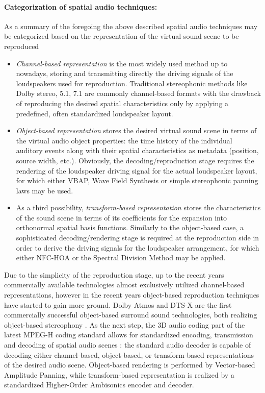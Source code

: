 \paragraph{Categorization of spatial audio techniques:}
As a summary of the foregoing the above described spatial audio techniques may be categorized based on the representation of the virtual sound scene to be reproduced \cite{Spors2013:Survey}
\begin{itemize}
\item \emph{Channel-based representation} is the most widely used method up to nowadays, storing and transmitting directly the driving signals of the loudspeakers used for reproduction.
Traditional stereophonic methods like Dolby stereo, 5.1, 7.1 are commonly channel-based formats with the drawback of reproducing the desired spatial characteristics only by applying a predefined, often standardized loudspeaker layout.
%
\item \emph{Object-based representation} stores the desired virtual sound scene in terms of the virtual audio object properties: the time history of the individual auditory events along with their spatial characteristics as metadata (position, source width, etc.).
Obviously, the decoding/reproduction stage requires the rendering of the loudspeaker driving signal for the actual loudspeaker layout, for which either VBAP, Wave Field Synthesis or simple stereophonic panning laws may be used.
%
\item As a third possibility, \emph{transform-based representation} stores the characteristics of the sound scene in terms of its coefficients for the expansion into  orthonormal spatial basis functions.
Similarly to the object-based case, a sophisticated decoding/rendering stage is required at the reproduction side in order to derive the driving signals for the loudspeaker arrangement, for which either NFC-HOA or the Spectral Division Method may be applied.
\end{itemize}

Due to the simplicity of the reproduction stage, up to the recent years commercially available technologies almost exclusively utilized channel-based representations,
however in the recent years object-based reproduction techniques have started to gain more ground.
Dolby Atmos and DTS-X are the first commercially successful object-based surround sound technologies, both realizing object-based stereophony \cite{Atmos}.
As the next step, the 3D audio coding part of the latest MPEG-H coding standard allows for standardized encoding, transmission and decoding of spatial audio scenes \cite{herre2015mpeg, 7056445}:
the standard audio decoder is capable of decoding either channel-based, object-based, or transform-based representations of the desired audio scene.
Object-based rendering is performed by Vector-based Amplitude Panning, while transform-based representation is realized by a standardized Higher-Order Ambisonics encoder and decoder.

